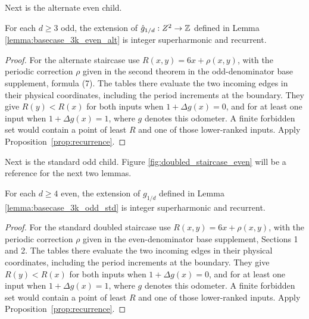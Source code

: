 \documentclass[12pt]{amsart}
\begin{document}
Next is the alternate even child.
\begin{lemma} \label{lemma:alt-staircase-recurrent}
	For each $d \geq 3$ odd, the extension of $\hat{g}_{1/d}:Z^2 \to \mathbb{Z}$ defined in Lemma \ref{lemma:basecase_3k_even_alt}
	is integer superharmonic and recurrent. 
\end{lemma}
\begin{proof}
For the alternate staircase use $R(x,y)=6x+\rho(x,y)$, with the periodic correction $\rho$ given in the second theorem in the odd-denominator base supplement, formula (7). The tables there evaluate the two incoming edges in their physical coordinates, including the period increments at the boundary. They give $R(y)<R(x)$ for both inputs when $1+\Delta g(x)=0$, and for at least one input when $1+\Delta g(x)=1$, where $g$ denotes this odometer. A finite forbidden set would contain a point of least $R$ and one of those lower-ranked inputs. Apply Proposition~\ref{prop:recurrence}.
\end{proof}



Next is the standard odd child. Figure \ref{fig:doubled_staircase_even} will be a reference for the next two lemmas. 
\begin{lemma} \label{lemma:doubled-staircase-recurrent}
	For each $d \geq 4$ even, the extension of $g_{1/d}$ defined in Lemma \ref{lemma:basecase_3k_odd_std} is
	integer superharmonic and recurrent. 
\end{lemma}
\begin{proof}
For the standard doubled staircase use $R(x,y)=6x+\rho(x,y)$, with the periodic correction $\rho$ given in the even-denominator base supplement, Sections 1 and 2. The tables there evaluate the two incoming edges in their physical coordinates, including the period increments at the boundary. They give $R(y)<R(x)$ for both inputs when $1+\Delta g(x)=0$, and for at least one input when $1+\Delta g(x)=1$, where $g$ denotes this odometer. A finite forbidden set would contain a point of least $R$ and one of those lower-ranked inputs. Apply Proposition~\ref{prop:recurrence}.
\end{proof}
\end{document}

